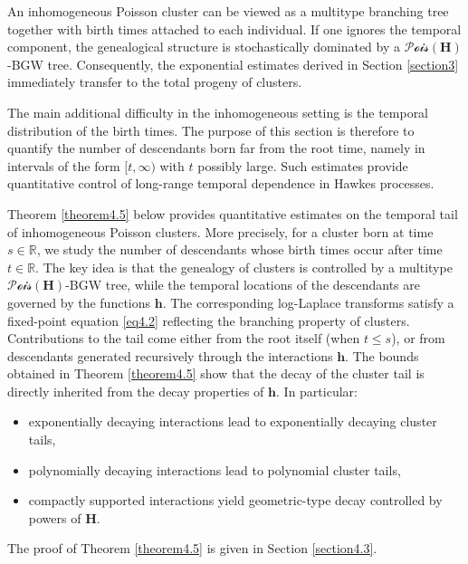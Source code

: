 \documentclass[reqno,final,11pt]{amsart}
\theoremstyle{plain}
\theoremstyle{definition}
\theoremstyle{remark}
\newcommand{\R}{\mathds{R}}
\newcommand{\h}{\bm{h}}
\renewcommand{\H}{\bm{H}}
\newcommand{\Pois}{\mathscr{P}\!\mathscr{o}\!\mathscr{i}\!\mathscr{s}}
\begin{document}
An inhomogeneous Poisson cluster can be viewed as a multitype branching tree together with birth times attached to each individual. If one ignores the temporal component, the genealogical structure is stochastically dominated by a $\Pois(\H)$-BGW tree. Consequently, the exponential estimates derived in Section \ref{section3} immediately transfer to the total progeny of clusters.

The main additional difficulty in the inhomogeneous setting is the temporal distribution of the birth times. The purpose of this section is therefore to quantify the number of descendants born far from the root time, namely in intervals of the form $[t,\infty)$ with $t$ possibly large. Such estimates provide quantitative control of long-range temporal dependence in Hawkes processes.

Theorem \ref{theorem4.5} below provides quantitative estimates on the temporal tail of inhomogeneous Poisson clusters. More precisely, for a cluster born at time $s\in\R$, we study the number of descendants whose birth times occur after time $t\in\R$. The key idea is that the genealogy of clusters is controlled by a multitype $\Pois(\H)$-BGW tree, while the temporal locations of the descendants are governed by the functions $\h$. The corresponding log-Laplace transforms satisfy a fixed-point equation \eqref{eq4.2} reflecting the branching property of clusters. Contributions to the tail come either from the root itself (when $t\leq s$), or from descendants generated recursively through the interactions $\h$. The bounds obtained in Theorem \ref{theorem4.5} show that the decay of the cluster tail is directly inherited from the decay properties of $\h$. In particular:
\begin{itemize}
    \item exponentially decaying interactions lead to exponentially decaying cluster tails,
    \item polynomially decaying interactions lead to polynomial cluster tails,
    \item compactly supported interactions yield geometric-type decay controlled by powers of $\H$.
\end{itemize}
The proof of Theorem \ref{theorem4.5} is given in Section \ref{section4.3}.
\end{document}
